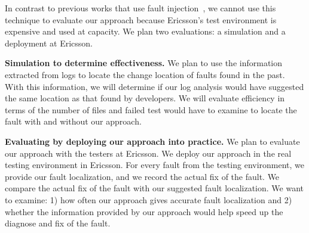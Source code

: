 
In contrast to previous works that use fault injection~\cite{Shang:2013:ADB:2486788.2486842}, we cannot use this technique to evaluate our approach because Ericsson's test environment is expensive and used at capacity. We plan two evaluations: a simulation and a deployment at Ericsson.

\noindent \textbf{Simulation to determine effectiveness.} We plan to use the information extracted from logs to locate the change location of faults found in the past. With this information, we will determine if our log analysis would have suggested the same location as that found by developers. We will evaluate efficiency in terms of the number of files and failed test would have to examine to locate the fault with and without our approach.
 
\noindent \textbf{Evaluating by deploying our approach into practice.} We plan to evaluate our approach with the testers at Ericsson. We deploy our approach in the real testing environment in Ericsson. For every fault from the testing environment, we provide our fault localization, and we record the actual fix of the fault. We compare the actual fix of the fault with our suggested fault localization. We want to examine: 1) how often our approach gives accurate fault localization and 2) whether the information provided by our approach would help speed up the diagnose and fix of the fault.


